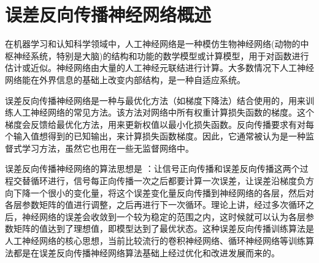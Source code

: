 \chapter{误差反向传播神经网络概述}
\label{cha:intro}

在机器学习和认知科学领域中，人工神经网络是一种模仿生物神经网络(动物的中枢神经系统，特别是大脑)的结构和功能的数学模型或计算模型，用于对函数进行估计或近似。神经网络由大量的人工神经元联结进行计算。大多数情况下人工神经网络能在外界信息的基础上改变内部结构，是一种自适应系统。

误差反向传播神经网络\cite{RepresentationsByBP}是一种与最优化方法（如梯度下降法）结合使用的，用来训练人工神经网络的常见方法。该方法对网络中所有权重计算损失函数的梯度。这个梯度会反馈给最优化方法，用来更新权值以最小化损失函数。反向传播要求有对每个输入值想得到的已知输出，来计算损失函数梯度。因此，它通常被认为是一种监督式学习方法，虽然它也用在一些无监督网络中。

误差反向传播神经网络的算法思想是 ：让信号正向传播和误差反向传播这两个过程交替循环进行，信号每正向传播一次之后都要计算一次误差，让误差沿梯度负方向下降一个很小的变化量，将这个误差变化量反向传播到神经网络的各层，然后对各层参数矩阵的值进行调整，之后再进行下一次循环。理论上讲，经过多次循环之后，神经网络的误差会收敛到一个较为稳定的范围之内，这时候就可以认为各层参数矩阵的值达到了理想值，即模型达到了最优状态。这种误差反向传播训练算法是人工神经网络的核心思想，当前比较流行的卷积神经网络、循环神经网络等训练算法都是在误差反向传播神经网络算法基础上经过优化和改进发展而来的。\cite{BPNNPrinciple}

